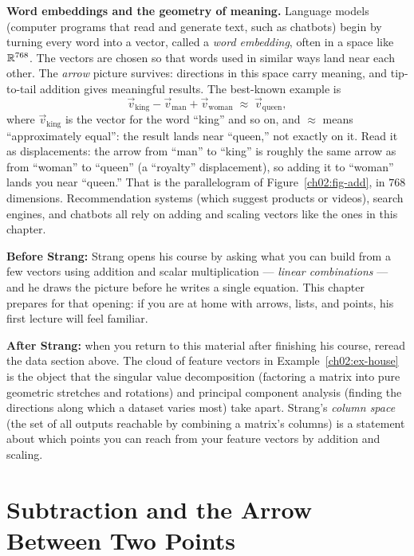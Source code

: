 \begin{applicationbox}
\textbf{Word embeddings and the geometry of meaning.} Language models (computer programs
that read and generate text, such as chatbots) begin by turning every word into a
vector, called a \emph{word embedding}, often in a space like $\mathbb{R}^{768}$. The vectors
are chosen so that words used in similar ways land near each other. The \emph{arrow}
picture survives: directions in this space carry meaning, and tip-to-tail addition
gives meaningful results. The best-known example is
\[
  \vec{v}_{\text{king}} - \vec{v}_{\text{man}} + \vec{v}_{\text{woman}}
  \;\approx\; \vec{v}_{\text{queen}},
\]
where $\vec{v}_{\text{king}}$ is the vector for the word ``king'' and so on, and
$\approx$ means ``approximately equal'': the result lands near ``queen,'' not exactly on it.
Read it as displacements: the arrow from ``man'' to ``king'' is roughly the same arrow as
from ``woman'' to ``queen'' (a ``royalty'' displacement), so adding it to ``woman''
lands you near ``queen.'' That is the parallelogram of Figure~\ref{ch02:fig-add}, in
$768$ dimensions. Recommendation systems (which suggest products or videos), search
engines, and chatbots all rely on adding and scaling vectors like the ones in this chapter.
\end{applicationbox}

\begin{strangbox}
\textbf{Before Strang:} Strang opens his course by asking what you can build from a few
vectors using addition and scalar multiplication --- \emph{linear combinations} --- and
he draws the picture before he writes a single equation. This chapter prepares for that
opening: if you are at home with arrows, lists, and points, his first lecture will feel
familiar.

\textbf{After Strang:} when you return to this material after finishing his course, reread
the data section above. The cloud of feature vectors in Example~\ref{ch02:ex-house} is
the object that the singular value decomposition (factoring a matrix into pure
geometric stretches and rotations) and principal component analysis (finding the
directions along which a dataset varies most) take apart. Strang's \emph{column space}
(the set of all outputs reachable by combining a matrix's columns) is a statement about
which points you can reach from your feature vectors by addition and scaling.
\end{strangbox}

\section{Subtraction and the Arrow Between Two Points}
\label{ch02:subtract}

